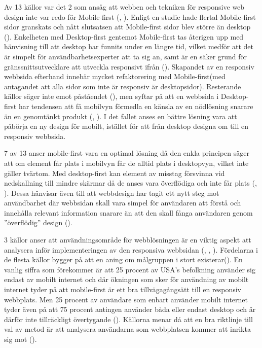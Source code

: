 \documentclass[11pt]{article}
\begin{document}
Av 13 källor var det 2 som ansåg att webben och tekniken för responsive web design inte var redo för Mobile-first (\cite{cloudfour}, \cite{armstrong}). Enligt en studie hade flertal Mobile-first sidor granskats och nått slutsatsen att Mobile-first sidor blev större än desktop (\cite{cloudfour}). Enkelheten med Desktop-first gentemot Mobile-first tas återigen upp med hänvisning till att desktop har funnits under en längre tid, vilket medför att det är simpelt för användbarhetsexperter att ta sig an, samt är en säker grund för gränssnittsutvecklare att utveckla responsivt ifrån (\cite{armstrong}). Skapandet av en responsiv webbsida efterhand innebär mycket refaktorering med Mobile-first(med antagandet att alla sidor som inte är responsiv är desktopsidor). Resterande källor säger inte emot påståendet (\cite{neocreo}), men syftar på att en webbsida i Desktop-first har tendensen att få mobilvyn förmedla en känsla av en nödlösning snarare än en genomtänkt produkt (\cite{designshack}, \cite{othermedia}). I det fallet anses en bättre lösning vara att påbörja en ny design för mobilt, istället för att från desktop designa om till en responsiv webbsida.
 
7 av 13 anser mobile-first vara en optimal lösning då den enkla principen säger att om element får plats i mobilvyn får de alltid plats i desktopvyn, vilket inte gäller tvärtom. Med desktop-first kan element av misstag försvinna vid nedskallning till mindre skärmar då de anses vara överflödiga och inte får plats (\cite{blogskent}, \cite{responsivedesign}). Dessa hänvisar även till att webbdesign har tagit ett nytt steg mot användbarhet där webbsidan skall vara simpel för användaren att förstå och innehålla relevant information snarare än att den skall fånga användaren genom ”överflödig” design (\cite{blogskent}). 

3 källor anser att användningsområde för webblösningen är en viktig aspekt att analysera inför implementeringen av den responsiva webbsidan (\cite{neocreo}, \cite{marcuspope}, \cite{designshack}). Fördelarna i de flesta källor bygger på att en aning om målgruppen i stort existerar(\cite{zurbword}). En vanlig siffra som förekommer är att 25 procent av USA’s befolkning använder sig endast av mobilt internet och där ökningen som sker för användning av mobilt internet tyder på att mobile-first är ett bra tillvägagångsätt till en responsiv webbplats.  Men 25 procent av användare som enbart använder mobilt internet tyder även på att 75 procent antingen använder båda eller endast desktop och är därför inte tillräckligt övertygande (\cite{marcuspope}). Källorna menar då att en bra riktlinje till val av metod är att analysera användarna som webbplatsen kommer att inrikta sig mot (\cite{neocreo}). 
\end{document}
